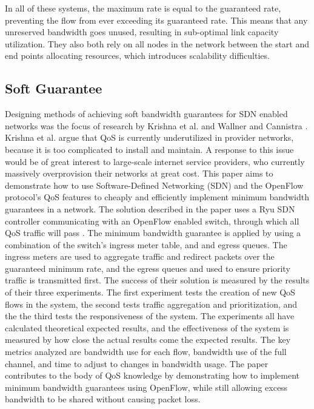 \documentclass[accepted,single]{gipaper}
\begin{document}
In all of these systems, the maximum rate is equal to the guaranteed rate, preventing the flow from ever exceeding its guaranteed rate. This means that any unreserved bandwidth goes unused, resulting in sub-optimal link capacity utilization. They also both rely on all nodes in the network between the start and end points allocating resources, which introduces scalability difficulties.

\subsection{Soft Guarantee}
\label{soft_qos}

Designing methods of achieving soft bandwidth guarantees for SDN enabled networks was the focus of research by Krishna et al. \cite{Krishna:2016} and Wallner and Cannistra \cite{Wallner:2013}.
\\


Krishna et al. \cite{Krishna:2016} argue that QoS is currently underutilized in provider networks, because it is too complicated to install and maintain. A response to this issue would be of great interest to large-scale internet service providers, who currently massively overprovision their networks at great cost. This paper aims to demonstrate how to use Software-Defined Networking (SDN) and the OpenFlow protocol’s QoS features to cheaply and efficiently implement minimum bandwidth guarantees in a network. The solution described in the paper uses a Ryu SDN controller communicating with an OpenFlow enabled switch, through which all QoS traffic will pass \cite{Krishna:2016}. The minimum bandwidth guarantee is applied by using a combination of the switch’s ingress meter table, and and egress queues. The ingress meters are used to aggregate traffic and redirect packets over the guaranteed minimum rate, and the egress queues and used to ensure priority traffic is transmitted first. The success of their solution is measured by the results of their three experiments. The first experiment tests the creation of new QoS flows in the system, the second tests traffic aggregation and prioritization, and the the third tests the responsiveness of the system. The experiments all have calculated theoretical expected results, and the effectiveness of the system is measured by how close the actual results come the expected results. The key metrics analyzed are bandwidth use for each flow, bandwidth use of the full channel, and time to adjust to changes in bandwidth usage. The paper contributes to the body of QoS knowledge by demonstrating how to implement minimum bandwidth guarantees using OpenFlow, while still allowing excess bandwidth to be shared without causing packet loss.
\end{document}
